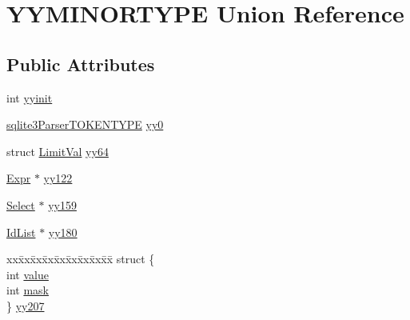 \hypertarget{union_y_y_m_i_n_o_r_t_y_p_e}{\section{Y\-Y\-M\-I\-N\-O\-R\-T\-Y\-P\-E Union Reference}
\label{union_y_y_m_i_n_o_r_t_y_p_e}
}
\subsection*{Public Attributes}
\begin{DoxyCompactItemize}
\item 
int \hyperlink{union_y_y_m_i_n_o_r_t_y_p_e_a6cec97309f473b42b70a9738d7cbd5ba}{yyinit}
\item 
\hyperlink{sqlite3_8c_a37d8d9e681b010c65b9932860dd4f0da}{sqlite3\-Parser\-T\-O\-K\-E\-N\-T\-Y\-P\-E} \hyperlink{union_y_y_m_i_n_o_r_t_y_p_e_a827d6a1bc7ac8df062b3f419db3f50ac}{yy0}
\item 
struct \hyperlink{struct_limit_val}{Limit\-Val} \hyperlink{union_y_y_m_i_n_o_r_t_y_p_e_aeb6b77e9a54a740178f47c10d2263f39}{yy64}
\item 
\hyperlink{struct_expr}{Expr} $\ast$ \hyperlink{union_y_y_m_i_n_o_r_t_y_p_e_a42df0f01a945b0edd4c2d444383271c6}{yy122}
\item 
\hyperlink{struct_select}{Select} $\ast$ \hyperlink{union_y_y_m_i_n_o_r_t_y_p_e_a9f223bea5f91f81654ec73b44da4e9e2}{yy159}
\item 
\hyperlink{struct_id_list}{Id\-List} $\ast$ \hyperlink{union_y_y_m_i_n_o_r_t_y_p_e_a85f445ea34e555f9fe590d7bf009ebe5}{yy180}
\item 
\begin{tabbing}
xx\=xx\=xx\=xx\=xx\=xx\=xx\=xx\=xx\=\kill
struct \{\\
\>int \hyperlink{union_y_y_m_i_n_o_r_t_y_p_e_abf0258f4d32c04817d6e9181f01586ad}{value}\\
\>int \hyperlink{union_y_y_m_i_n_o_r_t_y_p_e_aba553d6abee519200182f1ce31a90910}{mask}\\
\} \hyperlink{union_y_y_m_i_n_o_r_t_y_p_e_a16941245c1164b46217b91c7b4f56124}{yy207}\\


\end{tabbing}
\end{DoxyCompactItemize}
